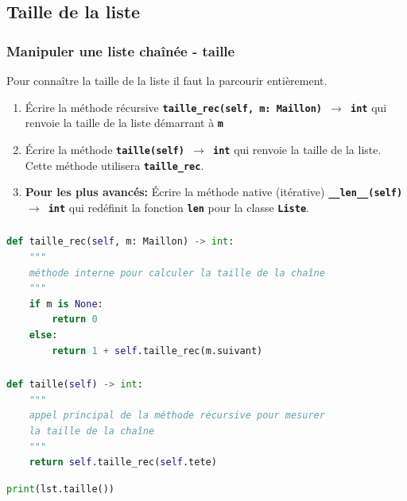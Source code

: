 \documentclass[svgnames,11pt]{beamer}
\begin{document}
\subsection{Taille de la liste}
\begin{frame}
    \frametitle{Manipuler une liste chaînée - taille}

    Pour connaître la taille de la liste il faut la parcourir entièrement.
    \begin{activite}
        \begin{enumerate}
            \item Écrire la méthode récursive \textbf{\texttt{taille\_rec(self, m: Maillon) $\rightarrow$ int}} qui renvoie la taille de la liste démarrant à \textbf{\texttt{m}}
            \item Écrire la méthode \textbf{\texttt{taille(self) $\rightarrow$ int}} qui renvoie la taille de la liste. Cette méthode utilisera \textbf{\texttt{taille\_rec}}.
            \item \textbf{Pour les plus avancés:} Écrire la méthode native (itérative) \textbf{\texttt{\_\_len\_\_(self) $\rightarrow$ int}} qui redéfinit la fonction \textbf{\texttt{len}} pour la classe \textbf{\texttt{Liste}}.
        \end{enumerate}
    \end{activite}

\end{frame}
\begin{frame}[fragile]
    \frametitle{}

    \begin{center}
        \begin{lstlisting}[language=Python , basicstyle=\ttfamily\small, xleftmargin=2em, xrightmargin=2em]
def taille_rec(self, m: Maillon) -> int:
    """
    méthode interne pour calculer la taille de la chaîne
    """
    if m is None:
        return 0
    else:
        return 1 + self.taille_rec(m.suivant)
\end{lstlisting}
    \end{center}

\end{frame}
\begin{frame}[fragile]
    \frametitle{}

    \begin{center}
        \begin{lstlisting}[language=Python , basicstyle=\ttfamily\small, xleftmargin=2em, xrightmargin=2em]
def taille(self) -> int:
    """
    appel principal de la méthode récursive pour mesurer
    la taille de la chaîne
    """
    return self.taille_rec(self.tete)
\end{lstlisting}
    \end{center}
    \begin{center}
        \begin{lstlisting}[language=Python , basicstyle=\ttfamily\small, xleftmargin=2em, xrightmargin=2em]
print(lst.taille())
\end{lstlisting}
        \label{CODE}
    \end{center}
\end{frame}
\end{document}
